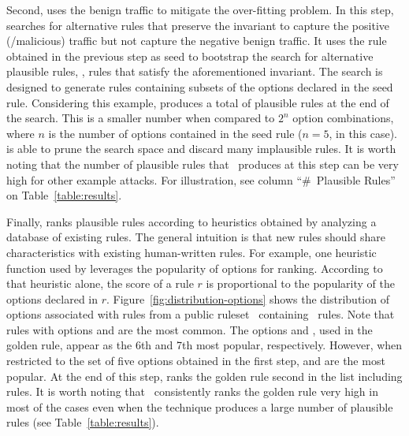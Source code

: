 \documentclass[conference]{IEEEtran}
\begin{document}


Second, \tname{} uses the benign traffic to mitigate the over-fitting
problem. In this step, \tname{} searches for alternative rules that
preserve the invariant to capture the positive (/malicious) traffic
but not capture the negative benign traffic. It uses the rule obtained
in the previous step as seed to bootstrap the search for alternative
plausible rules, \ie{}, rules that satisfy the aforementioned
invariant. The search is designed to generate rules containing subsets
of the options declared in the seed rule. Considering this example,
\tname{} produces a total of \pingscanplausible{} plausible rules at
the end of the search. This is a smaller number when compared to $2^n$
option combinations, where $n$ is the number of options contained in
the seed rule ($n=5$, in this case). \tname{} is able to prune the
search space and discard many implausible rules. It is worth noting
that the number of plausible rules that \tname\ produces at this step
can be very high for other example attacks. For illustration, see
column ``\#~Plausible Rules'' on Table~\ref{table:results}.


Finally, \tname{} ranks plausible rules according to heuristics
obtained by analyzing a database of existing rules. The general
intuition is that new rules should share characteristics with existing
human-written rules. For example, one heuristic function used by
\tname{} leverages the popularity of options for ranking. According to
that heuristic alone, the score of a rule $r$ is proportional to the
popularity of the options declared in
$r$. Figure~\ref{fig:distribution-options} shows the distribution of
options associated with rules from a public
ruleset~\cite{emerging-threats-open} containing
\numrulessuri\ rules. Note that rules with options 
and  are the most common. The options  and
, used in the golden rule, appear as the 6th and 7th
most popular, respectively. However, when restricted to the set of
five options obtained in the first step,  and
 are the most popular. At the end of this step, \tname{}
ranks the golden rule second in the list including
\pingscanplausible{} rules. It is worth noting that
\tname\ consistently ranks the golden rule very high in most of the
cases even when the technique produces a large number of plausible
rules (see Table~\ref{table:results}).
\end{document}

